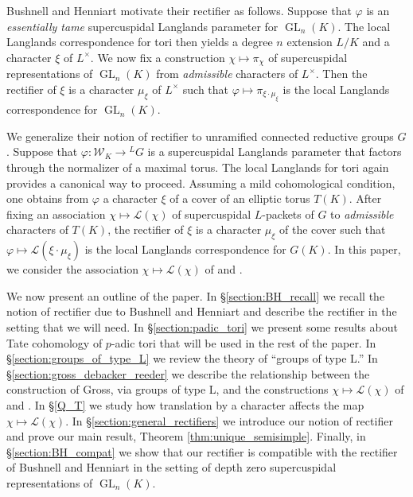 \documentclass{compositio}
\theoremstyle{plain}
\theoremstyle{definition}
\DeclareMathOperator{\GL}{GL}
\newcommand{\Weil}{\mathcal{W}}
\newcommand{\Lpack}{\mathcal{L}}
\begin{document}
Bushnell and Henniart motivate their rectifier as follows.
Suppose that $\varphi$ is an \emph{essentially tame} supercuspidal Langlands parameter for
$\GL_n(K)$.  The local Langlands correspondence for tori then yields a degree $n$ extension
$L/K$ and a character $\xi$ of $L^{\times}$.  We now fix a construction $\chi \mapsto \pi_{\chi}$
of supercuspidal representations of $\GL_n(K)$ from \emph{admissible} characters of $L^{\times}$.
Then the rectifier of $\xi$ is a character $\mu_{\xi}$ of $L^{\times}$ such that
$\varphi \mapsto \pi_{\xi \cdot \mu_{\xi}}$ is the local Langlands correspondence for $\GL_n(K)$.

We generalize their notion of rectifier to unramified connected reductive groups $G$.
Suppose that $\varphi : \Weil_K \rightarrow {}^L G$ is a supercuspidal Langlands parameter
that factors through the normalizer of a maximal torus.
The local Langlands for tori again provides a canonical way to proceed.  Assuming a mild
cohomological condition, one
obtains from $\varphi$ a character $\xi$ of a cover of an elliptic torus $T(K)$.
After fixing an association $\chi \mapsto \Lpack(\chi)$ of supercuspidal $L$-packets of $G$
to \emph{admissible} characters of $T(K)$, the rectifier of $\xi$ is a character
$\mu_{\xi}$ of the cover such that $\varphi \mapsto \Lpack(\xi \cdot \mu_{\xi})$
is the local Langlands correspondence for $G(K)$.  In this paper, we consider the association 
$\chi \mapsto \Lpack(\chi)$ of \cite{reeder-debacker:09a} and \cite{reeder:08a}.

We now present an outline of the paper.  In \S\ref{section:BH_recall} we recall
the notion of rectifier due to Bushnell and Henniart and describe
the rectifier in the setting that we will need.  In \S\ref{section:padic_tori}
we present some results about Tate cohomology of $p$-adic tori that will be used
in the rest of the paper.  In \S\ref{section:groups_of_type_L} we review
the theory of ``groups of type L.''  In
\S\ref{section:gross_debacker_reeder} we describe the relationship between the
construction of Gross, via groups of type L, and the constructions $\chi \mapsto \Lpack(\chi)$ of
\cite{reeder-debacker:09a} and \cite{reeder:08a}.  In \S\ref{Q_T} we study how translation by a character affects
the map $\chi \mapsto \Lpack(\chi)$.
In \S\ref{section:general_rectifiers} we
introduce our notion of rectifier and prove our main result, Theorem \ref{thm:unique_semisimple}.
Finally, in \S\ref{section:BH_compat} we show that our rectifier is compatible with
the rectifier of Bushnell and Henniart in the setting of depth zero
supercuspidal representations of $\GL_n(K)$.
\end{document}
